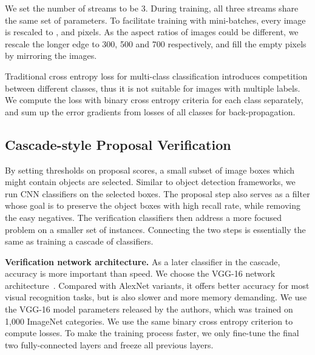 \documentclass[10pt,twocolumn,letterpaper]{article}
\begin{document}
We set the number of streams to be 3. During training, all three streams share the same set of parameters. To facilitate training with mini-batches, every image is rescaled to ,  and  pixels. As the aspect ratios of images could be different, we rescale the longer edge to 300, 500 and 700 respectively, and fill the empty pixels by mirroring the images. 

Traditional cross entropy loss for multi-class classification introduces competition between different classes, thus it is not suitable for images with multiple labels. We compute the loss with binary cross entropy criteria for each class separately, and sum up the error gradients from losses of all classes for back-propagation. 

\subsection{Cascade-style Proposal Verification}
By setting thresholds on proposal scores, a small subset of image boxes which might contain objects are selected. Similar to object detection frameworks, we run CNN classifiers on the selected boxes. The proposal step also serves as a filter whose goal is to preserve the object boxes with high recall rate, while removing the easy negatives. The verification classifiers then address a more focused problem on a smaller set of instances. Connecting the two steps is essentially the same as training a cascade of classifiers.

\textbf{Verification network architecture.} As a later classifier in the cascade, accuracy is more important than speed. We choose the VGG-16 network architecture~\cite{Simonyan14c}. Compared with AlexNet variants, it offers better accuracy for most visual recognition tasks, but is also slower and more memory demanding. We use the VGG-16 model parameters released by the authors, which was trained on 1,000 ImageNet categories. We use the same binary cross entropy criterion to compute losses. To make the training process faster, we only fine-tune the final two fully-connected layers and freeze all previous layers.
\end{document}
